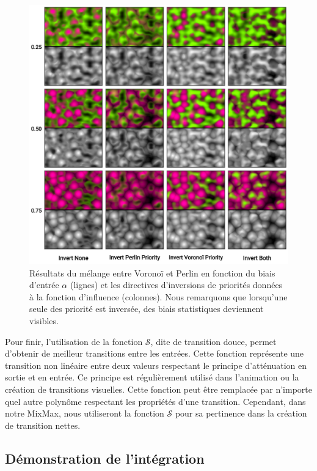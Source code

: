 \documentclass[9pt, twocolumn]{article} %
\begin{document}
\begin{figure}
  \includegraphics[width=\linewidth]{figures/MixMax_Invert.png}
  \caption{
    Résultats du mélange entre Voronoï et Perlin en fonction du biais d'entrée $\alpha$ (lignes) et les directives d'inversions de priorités données à la fonction d'influence (colonnes). Nous remarquons que lorsqu'une seule des priorité est inversée, des biais statistiques deviennent visibles.
  }
  \label{fig::MixMax_Invert}
\end{figure}

Pour finir, l'utilisation de la fonction $\mathcal{S}$, dite de transition
douce, permet d'obtenir de meilleur transitions entre les entrées. Cette
fonction représente une transition non linéaire entre deux valeurs respectant
le principe d'atténuation en sortie et en entrée. Ce principe est régulièrement
utilisé dans l'animation ou la création de transitions visuelles. Cette
fonction peut être remplacée par n'importe quel autre polynôme respectant les
propriétés d'une transition. Cependant, dans notre MixMax, nous utiliseront la
fonction $\mathcal{S}$ pour sa pertinence dans la création de transition
nettes.

\subsection{Démonstration de l'intégration}

\newpage

\printbibliography %
\end{document}
